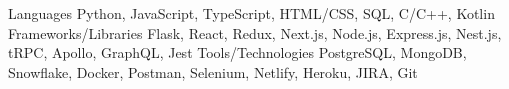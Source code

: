
\begin{cvskills}
  \cvskill
    {Languages} %
    {Python, JavaScript, TypeScript, HTML/CSS, SQL, C/C++, Kotlin} %
  \cvskill
    {Frameworks/Libraries} %
    {Flask, React, Redux, Next.js, Node.js, Express.js, Nest.js, tRPC, Apollo, GraphQL, Jest} %
  \cvskill
    {Tools/Technologies} %
    {PostgreSQL, MongoDB, Snowflake, Docker, Postman, Selenium, Netlify, Heroku, JIRA, Git} %
\end{cvskills}
